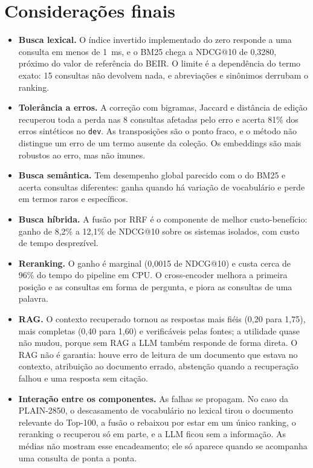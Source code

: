 \documentclass[11pt,a4paper]{article}
\newcommand{\cod}[1]{\texttt{#1}}
\begin{document}
\FloatBarrier
\section{Considerações finais}
\label{sec:conclusao}

\begin{itemize}
\item \textbf{Busca lexical.} O índice invertido implementado do zero responde a uma consulta em menos de 1~ms, e o BM25 chega a NDCG@10 de 0,3280, próximo do valor de referência do BEIR. O limite é a dependência do termo exato: 15 consultas não devolvem nada, e abreviações e sinônimos derrubam o ranking.
\item \textbf{Tolerância a erros.} A correção com bigramas, Jaccard e distância de edição recuperou toda a perda nas 8 consultas afetadas pelo erro e acerta 81\% dos erros sintéticos no \cod{dev}. As transposições são o ponto fraco, e o método não distingue um erro de um termo ausente da coleção. Os embeddings são mais robustos ao erro, mas não imunes.
\item \textbf{Busca semântica.} Tem desempenho global parecido com o do BM25 e acerta consultas diferentes: ganha quando há variação de vocabulário e perde em termos raros e específicos.
\item \textbf{Busca híbrida.} A fusão por RRF é o componente de melhor custo-benefício: ganho de 8,2\% a 12,1\% de NDCG@10 sobre os sistemas isolados, com custo de tempo desprezível.
\item \textbf{Reranking.} O ganho é marginal (0,0015 de NDCG@10) e custa cerca de 96\% do tempo do pipeline em CPU. O cross-encoder melhora a primeira posição e as consultas em forma de pergunta, e piora as consultas de uma palavra.
\item \textbf{RAG.} O contexto recuperado tornou as respostas mais fiéis (0,20 para 1,75), mais completas (0,40 para 1,60) e verificáveis pelas fontes; a utilidade quase não mudou, porque sem RAG a LLM também responde de forma direta. O RAG não é garantia: houve erro de leitura de um documento que estava no contexto, atribuição ao documento errado, abstenção quando a recuperação falhou e uma resposta sem citação.
\item \textbf{Interação entre os componentes.} As falhas se propagam. No caso da PLAIN-2850, o descasamento de vocabulário no lexical tirou o documento relevante do Top-100, a fusão o rebaixou por estar em um único ranking, o reranking o recuperou só em parte, e a LLM ficou sem a informação. As médias não mostram esse encadeamento; ele só aparece quando se acompanha uma consulta de ponta a ponta.
\end{itemize}
\end{document}

